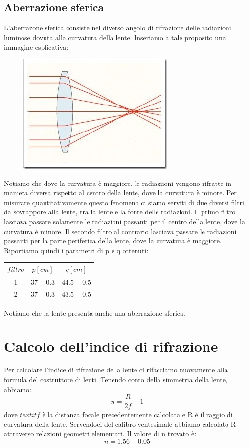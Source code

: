 \documentclass[a4paper,11pt]{article}
\begin{document}
\subsection{Aberrazione sferica}
L'aberrazone sferica consiste nel diverso angolo di rifrazione delle radiazioni luminose dovuta alla curvatura della lente. Inseriamo a tale proposito una immagine esplicativa:
\begin{center} 
\begin{figure}[htpd]
\hspace{140 pt}
\includegraphics[scale=0.90]{aberrazione_sferica.png}


\end{figure}
\end{center}
Notiamo che dove la curvatura è maggiore, le radiaziioni vengono rifratte in maniera diversa rispetto al centro della lente, dove la curvatura è minore. Per misurare quantitativamente questo fenomeno ci siamo serviti di due diversi filtri da sovrappore alla lente, tra la lente e la fonte delle radiazioni. Il primo filtro lasciava passare solamente le radiazioni passanti per il centro della lente, dove la curvatura è minore. Il secondo filtro al contrario lasciava passare le radiazioni passanti per la parte periferica della lente, dove la curvatura è maggiore. Riportiamo quindi i parametri di p e q ottenuti:\\
\begin{center}
\begin{tabular}{|c|c|c|}
\hline $filtro$ & $p [cm]$ & $q [cm]$ \\ 
\hline 1 & $37 \pm 0.3$ & $44.5 \pm 0.5$ \\ 
\hline 2 & $37 \pm 0.3$ & $43.5 \pm 0.5$ \\ 
\hline 
\end{tabular} 
\end{center}
Notiamo che la lente presenta anche una aberrazione sferica.
\section{Calcolo dell'indice di rifrazione}
Per calcolare l'indice di rifrazione della lente ci rifacciamo nuovamente alla formula del costruttore di lenti. Tenendo conto della simmetria della lente, abbiamo: $$n=\frac{R}{2\textit{f}}+1$$
dove $textit{f}$ è la distanza focale precedentemente calcolata e R è il raggio di curvatura della lente. Servendoci del calibro ventesimale abbiamo calcolato R attraverso relazioni geometri elementari. Il valore di n trovato è: $$n = 1.56\pm 0.05$$
\end{document}
